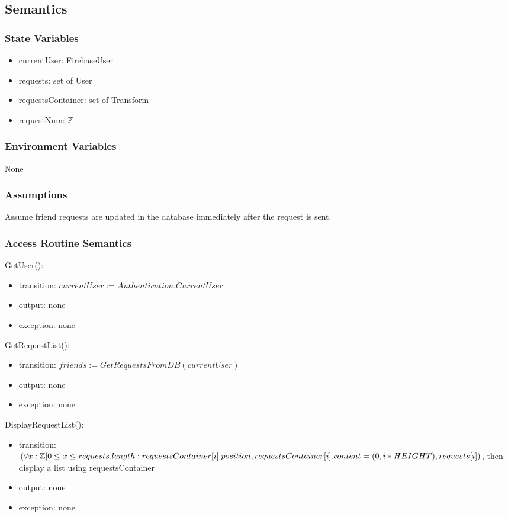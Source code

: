 \documentclass[12pt, titlepage]{article}
\begin{document}
\subsection{Semantics}

\subsubsection{State Variables}

\begin{itemize}
\item currentUser: FirebaseUser
\item requests: set of User
\item requestsContainer: set of Transform
\item requestNum: $\mathbb{Z}$
\end{itemize}

\subsubsection{Environment Variables}

None

\subsubsection{Assumptions}

Assume friend requests are updated in the database immediately after the request is sent.

\subsubsection{Access Routine Semantics}

\noindent GetUser():
\begin{itemize}
\item transition: $currentUser := Authentication.CurrentUser$
\item output: none
\item exception: none
\end{itemize}

\noindent GetRequestList():
\begin{itemize}
\item transition: $friends := GetRequestsFromDB(currentUser)$ 
\item output: none
\item exception: none
\end{itemize}

\noindent DisplayRequestList():
\begin{itemize}
\item transition: $(\forall x : \mathbb{Z} | 0 \leq x \leq requests.length:\\ requestsContainer[i].position, requestsContainer[i].content = (0, i*HEIGHT), requests[i])$, then display a list using requestsContainer
\item output: none
\item exception: none
\end{itemize}
\end{document}
